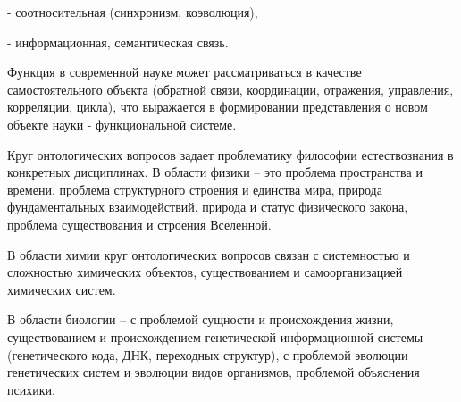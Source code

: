 \documentclass[exam_answers.tex]{subfiles}
\begin{document}
- соотносительная (синхронизм, коэволюция),

- информационная, семантическая связь.

Функция в современной науке может рассматриваться в качестве
самостоятельного объекта (обратной связи, координации, отражения,
управления, корреляции, цикла), что выражается в формировании
представления о новом объекте науки - функциональной системе.

Круг онтологических вопросов задает проблематику философии
естествознания в конкретных дисциплинах. В области физики – это проблема
пространства и времени, проблема структурного строения и единства мира,
природа фундаментальных взаимодействий, природа и статус физического
закона, проблема существования и строения Вселенной.

В области химии круг онтологических вопросов связан с системностью и
сложностью химических объектов, существованием и самоорганизацией
химических систем.

В области биологии – с проблемой сущности и происхождения жизни,
существованием и происхождением генетической информационной системы
(генетического кода, ДНК, переходных структур), с проблемой эволюции
генетических систем и эволюции видов организмов, проблемой объяснения
психики.
\end{document}
